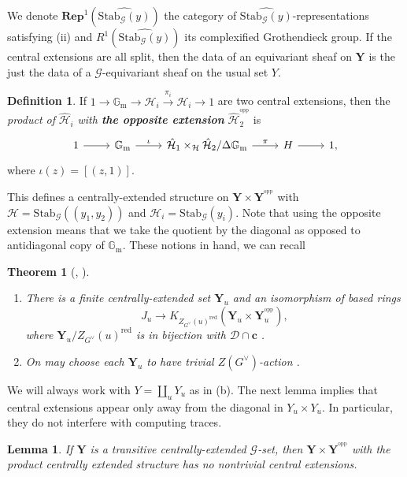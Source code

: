 \documentclass[10pt]{article}
\newcommand{\stab}[2]{\mathrm{Stab}_{#1}(#2)}
\newcommand{\opp}{^\mathrm{opp}}
\newcommand{\Rep}{\mathbf{Rep}}
\newcommand{\cc}{\mathbf{c}}
\newcommand{\Gm}{{\mathbb{G}_\mathrm{m}}}
\newtheorem{theorem}{Theorem}
\newtheorem{lem}{Lemma}
\theoremstyle{definition}
\newtheorem{dfn}{Definition}
\theoremstyle{remark}
\newcommand{\Gd}{G^\vee}
\newcommand{\Zur}{Z_{G^\vee}(u)^{\mathrm{red}}}
\newcommand{\Yext}{\mathbf{Y}}
\newcommand{\Zz}{\mathcal{G}}
\newcommand{\Y}{\mathbf{Y}}
\begin{document}
%
We denote
$\Rep^1(\widehat{\stab{\Zz}{y}})$ the category of $\widehat{\stab{\Zz}{y}}$-representations
satisfying (ii) and $R^1(\widehat{\stab{\Zz}{y}})$ its complexified Grothendieck group.
If the central extensions are all split, then the data of an equivariant sheaf 
on $\Y$ is the just the data of a $\Zz$-equivariant sheaf on the usual set $Y$. 
%
\begin{dfn}
\label{dfn product with opp}
If $1\to\Gm\to\hat{\mathcal{H}}_i\overset{\pi_i}{\to}\mathcal{H}_i\to 1$ are two central extensions, then the \emph{product of} $\hat{\mathcal{H}}_i$ \emph{with \textbf{the opposite extension}} 
$\hat{\mathcal{H}}_2^{\opp}$ is 
%
\[
\begin{tikzcd}
1\arrow[r]&\Gm\arrow[r, "\iota"]&\hat{\mathcal{H}}_1\times_\mathcal{H}\hat{\mathcal{H}}_2/\Delta\Gm\arrow[r, "\pi"]& H\arrow[r]& 1,
\end{tikzcd}
\]
%
where $\iota(z)=[(z,1)]$.
\end{dfn}
%
This defines a centrally-extended structure on $\Yext\times\Yext^{\opp}$ with 
$\mathcal{H}=\stab{\Zz}{(y_1,y_2)}$ and $\mathcal{H}_i=\stab{\Zz}{y_i}$.
Note that using the opposite extension means that we take the quotient by the diagonal as opposed
to antidiagonal copy of $\Gm$. These notions in hand, we  can recall
%
\begin{theorem}[\cite{BO}, \cite{BL}]
\begin{enumerate}
\item[(a)] 
There is a finite centrally-extended set $\Yext_u$ and an isomorphism of based 
rings
%
\[
J_u\to K_{\Zur}(\Yext_u\times\Yext_u^{\opp}),
\]
%
where $\Yext_u/\Zur$ is in bijection with $\mathcal{D}\cap\cc$ \cite{BO}. 
%
\item[(b)]
%
On may choose each $\Yext_u$ to have trivial $Z(\Gd)$-action \cite{BL}.
\end{enumerate}
%
\end{theorem}
%
We will always work with $Y=\coprod_uY_u$ as in (b).
The next lemma implies that central extensions appear only away from the diagonal in 
$Y_u\times Y_u$. In particular, they do not interfere with computing traces.
%
\begin{lem}
\label{lem opp-square of transitive set is trivial}
If $\Y$ is a transitive centrally-extended $\Zz$-set, then $\Y\times \Y^{\opp}$ with the product centrally 
extended structure has no nontrivial central extensions.
\end{lem}
%
\end{document}
